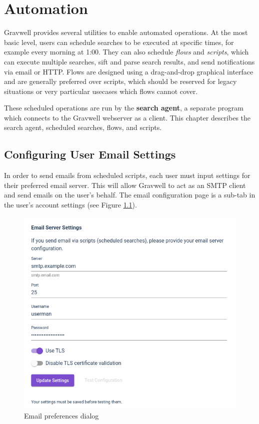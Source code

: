 \chapter{Automation}

Gravwell provides several utilities to enable automated operations.
At the most basic level, users can schedule searches to be executed at specific times, for
example every morning at 1:00. They can also schedule
\emph{flows} and \emph{scripts}, which can execute multiple searches, sift and parse search
results, and send notifications via email or HTTP. Flows are designed using a drag-and-drop
graphical interface and are generally preferred over scripts, which should be reserved for legacy
situations or very particular usecases which flows cannot cover.

These scheduled
operations are run by the \textbf{search agent}, a separate program which
connects to the Gravwell webserver as a client. This chapter describes
the search agent, scheduled searches, flows, and scripts.

\section{Configuring User Email Settings}

In order to send emails from scheduled scripts, each user must input
settings for their preferred email server. This will allow Gravwell to
act as an SMTP client and send emails on the user's behalf. The email
configuration page is a sub-tab in the user's account settings (see Figure \ref{fig:email-prefs}).

\begin{figure}
	\includegraphics[width=0.7\linewidth]{images/email-prefs.png}
	\caption{Email preferences dialog}
	\label{fig:email-prefs}
\end{figure}

